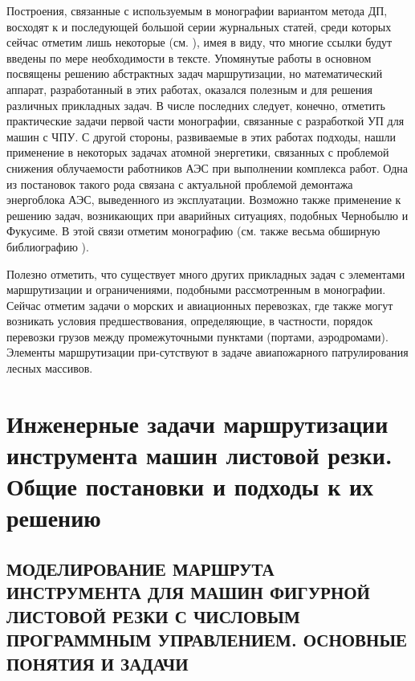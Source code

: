 \documentclass[12pt]{report}
\begin{document}
Построения, связанные с используемым в монографии
вариантом метода ДП, восходят к
\cite{Cha1`} и последующей большой серии
журнальных статей,
среди которых сейчас отметим лишь некоторые
(см. \cite{Cha8`,intro51,intro52,intro53,intro54,intro55,intro56}),
имея в виду, что многие ссылки будут
введены по мере необходимости в тексте.
Упомянутые работы
\cite{Cha8`,intro51,intro52,intro53,intro54,intro55,intro56}
в основном посвящены решению абстрактных задач маршрутизации,
но математический аппарат, разработанный в этих работах,
оказался полезным и для решения различных прикладных задач.
В числе последних следует, конечно,
отметить практические задачи первой части монографии,
связанные с разработкой УП для машин с ЧПУ.
С другой стороны, развиваемые в этих работах подходы,
нашли применение в некоторых задачах атомной энергетики,
связанных с проблемой снижения облучаемости работников АЭС
при выполнении комплекса работ.
Одна из постановок такого рода связана с
актуальной проблемой демонтажа энергоблока АЭС,
выведенного из эксплуатации.
Возможно также применение к решению задач,
возникающих при аварийных ситуациях,
подобных Чернобылю и Фукусиме.
В этой связи отметим монографию \cite{Cha2`}
(см. также весьма обширную библиографию \cite{Cha2`}).

Полезно отметить, что существует много других прикладных задач
с элементами маршрутизации и ограничениями,
подобными рассмотренным в монографии.
Сейчас отметим задачи о морских и авиационных перевозках,
где также могут возникать условия предшествования,
определяющие, в частности, порядок перевозки грузов
между промежуточными пунктами (портами, аэродромами).
Элементы маршрутизации при-сутствуют в задаче
авиапожарного патрулирования лесных массивов.


\part{Инженерные задачи
маршрутизации инструмента машин листовой резки.
Общие постановки и подходы к их решению}

\chapter{МОДЕЛИРОВАНИЕ МАРШРУТА ИНСТРУМЕНТА ДЛЯ МАШИН ФИГУРНОЙ ЛИСТОВОЙ РЕЗКИ С
ЧИСЛОВЫМ ПРОГРАММНЫМ УПРАВЛЕНИЕМ.
ОСНОВНЫЕ ПОНЯТИЯ И ЗАДАЧИ}
\setcounter{chapter}{1}
\setcounter{equation}{0}
\end{document}
